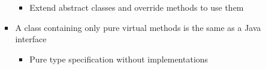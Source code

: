 \begin{itemize}
\begin{itemize}
\begin{itemize}
\begin{itemize}
              \item Extend abstract classes and override methods to use them

            \end{itemize}
            
          \item A class containing only pure virtual methods is the same as a Java interface

            \begin{itemize}

              \item Pure type specification without implementations

            \end{itemize}

        \end{itemize}

    \end{itemize}

\end{itemize}



